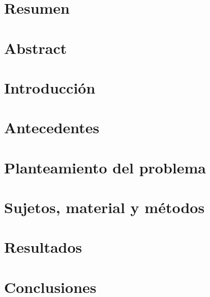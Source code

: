\documentclass[12pt, letterpaper, oneside, openany]{book}
\begin{document}


\pagestyle{empty}
% 
% 
% 


\frontmatter
\pagestyle{plain}
\chapter*{\center Resumen}


\chapter*{\center Abstract}

\tableofcontents

\mainmatter
{}
\newcommand{\hsp}{\hspace{15pt}}
\titleformat{\chapter}[hang]{\Huge\bfseries}{\thechapter\hsp\textcolor{gray42}{\textbar}\hsp}{0pt}{\Huge\bfseries}

\chapter{Introducción}


\chapter{Antecedentes}


\chapter{Planteamiento del problema}


\chapter{Sujetos, material y métodos}


\chapter{Resultados}


\chapter{Conclusiones}


\backmatter
{}
\printbibliography
\listoffigures
\listoftables
\end{document}
